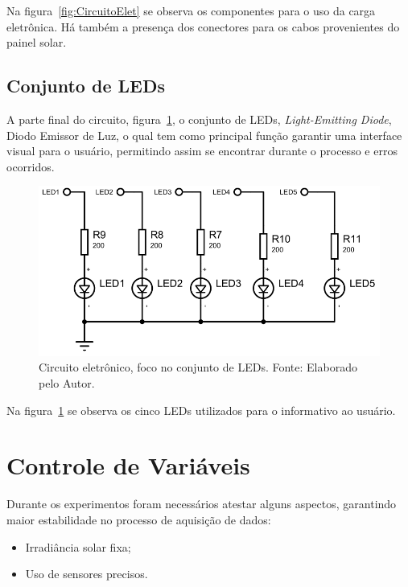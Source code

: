 Na figura~\ref{fig:CircuitoElet} se observa os componentes para o uso da carga eletrônica. Há também a presença dos conectores para os cabos provenientes do painel solar.

\subsection{Conjunto de LEDs}

A parte final do circuito,  figura~\ref{fig:CircuitoLED}, o conjunto de LEDs, \textit{Light-Emitting Diode}, Diodo Emissor de Luz, o qual tem como principal função garantir uma interface visual para o usuário, permitindo assim se encontrar durante o processo e erros ocorridos.

\begin{figure}[!htbp]
	\centering
	\includegraphics[scale=0.8]{imagens/CircuitoLED.png}
	\caption{Circuito eletrônico, foco no conjunto de LEDs. Fonte: Elaborado pelo Autor. 	}
	\label{fig:CircuitoLED}
\end{figure}
\FloatBarrier

Na figura~\ref{fig:CircuitoLED} se observa os cinco LEDs utilizados para o informativo ao usuário.

\section{Controle de Variáveis}
Durante os experimentos foram necessários atestar alguns aspectos, garantindo maior estabilidade no processo de aquisição de dados:
\begin{itemize}
\item Irradiância solar fixa;
\item Uso de sensores precisos.
\end{itemize}

